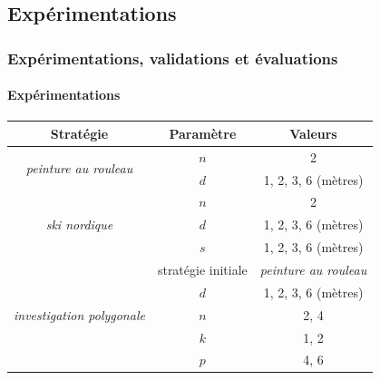 \documentclass{beamer}
\begin{document}
		\subsection{Expérimentations}
			\begin{frame}
				\frametitle{Expérimentations, validations et évaluations}
				\framesubtitle{Expérimentations}
				\begin{table}[H]
					\centering
					\begin{tabular}{|c|c|c|}
						\hline
						Stratégie & Paramètre & Valeurs \\
						\hline
						\multirow{2}{*}{\textit{peinture au rouleau}} & $n$ & 2 \\
						& $d$ & 1, 2, 3, 6 (mètres) \\
						\hline
						\multirow{3}{*}{\textit{ski nordique}} & $n$ & 2 \\
						& $d$ & 1, 2, 3, 6 (mètres) \\
						& $s$ & 1, 2, 3, 6 (mètres) \\
						\hline
						\multirow{5}{*}{\textit{investigation polygonale}} & stratégie initiale & \textit{peinture au rouleau} \\
						& $d$ & 1, 2, 3, 6 (mètres) \\
						& $n$ & 2, 4 \\
						& $k$ & 1, 2 \\
						& $p$ & 4, 6 \\
						\hline
					\end{tabular}
				\end{table}
			\end{frame}
\end{document}
